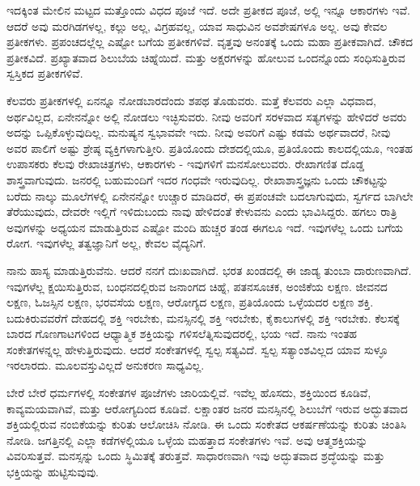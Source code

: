 ಇದಕ್ಕಿಂತ ಮೇಲಿನ ಮಟ್ಟದ ಮತ್ತೊಂದು ವಿಧದ ಪೂಜೆ ಇದೆ. ಅದೇ ಪ್ರತೀಕದ ಪೂಜೆ, ಅಲ್ಲಿ ಇನ್ನೂ ಆಕಾರಗಳು ಇವೆ. ಆದರೆ ಅವು ಮರಗಿಡಗಳಲ್ಲ, ಕಲ್ಲು ಅಲ್ಲ, ವಿಗ್ರಹವಲ್ಲ, ಯಾವ ಸಾಧುವಿನ ಅವಶೇಷಗಳೂ ಅಲ್ಲ. ಅವು ಕೇವಲ ಪ್ರತೀಕಗಳು. ಪ್ರಪಂಚದಲ್ಲೆಲ್ಲ ಎಷ್ಟೋ ಬಗೆಯ ಪ್ರತೀಕಗಳಿವೆ. ವೃತ್ತವು ಅನಂತಕ್ಕೆ ಒಂದು ಮಹಾ ಪ್ರತೀಕವಾಗಿದೆ. ಚೌಕದ ಪ್ರತೀಕವಿದೆ. ಪ್ರಖ್ಯಾತವಾದ ಶಿಲುಬೆಯ ಚಿಹ್ನೆಯಿದೆ.  ಮತ್ತು  ಅಕ್ಷರಗಳನ್ನು ಹೋಲುವ ಒಂದನ್ನೊಂದು ಸಂಧಿಸುತ್ತಿರುವ ಸ್ವಸ್ತಿಕದ ಪ್ರತೀಕಗಳಿವೆ.

ಕೆಲವರು ಪ್ರತೀಕಗಳಲ್ಲಿ ಏನನ್ನೂ ನೋಡಬಾರದೆಂದು ಶಪಥ ತೊಡುವರು. ಮತ್ತೆ ಕೆಲವರು ಎಲ್ಲಾ ವಿಧವಾದ, ಅರ್ಥವಿಲ್ಲದ, ಏನೇನನ್ನೋ ಅಲ್ಲಿ ನೋಡಲು ಇಚ್ಛಿಸುವರು. ನೀವು ಅವರಿಗೆ ಸರಳವಾದ ಸತ್ಯಗಳನ್ನು ಹೇಳಿದರೆ ಅವರು ಅದನ್ನು ಒಪ್ಪಿಕೊಳ್ಳುವುದಿಲ್ಲ. ಮನುಷ್ಯನ ಸ್ವಭಾವವೇ ಇದು. ನೀವು ಅವರಿಗೆ ಎಷ್ಟು ಕಡಮೆ ಅರ್ಥವಾದರೆ, ನೀವು ಅವರ ಪಾಲಿಗೆ ಅಷ್ಟು ಶ್ರೇಷ್ಠ ವ್ಯಕ್ತಿಗಳಾಗುತ್ತೀರಿ. ಪ್ರತಿಯೊಂದು ದೇಶದಲ್ಲಿಯೂ, ಪ್ರತಿಯೊಂದು ಕಾಲದಲ್ಲಿಯೂ, ಇಂತಹ ಉಪಾಸಕರು ಕೆಲವು ರೇಖಾಚಿತ್ರಗಳು, ಆಕಾರಗಳು - ಇವುಗಳಿಗೆ ಮನಸೋಲುವರು. ರೇಖಾಗಣಿತ ದೊಡ್ಡ ಶಾಸ್ತ್ರವಾಗುವುದು. ಜನರಲ್ಲಿ ಬಹುಮಂದಿಗೆ ಇದರ ಗಂಧವೇ ಇರುವುದಿಲ್ಲ. ರೇಖಾಶಾಸ್ತ್ರಜ್ಞನು ಒಂದು ಚೌಕಟ್ಟನ್ನು ಬರೆದು ನಾಲ್ಕು ಮೂಲೆಗಳಲ್ಲಿ ಏನೇನನ್ನೋ ಉಚ್ಚಾರ ಮಾಡಿದರೆ, ಈ ಪ್ರಪಂಚವೇ ಬದಲಾಗುವುದು, ಸ್ವರ್ಗದ ಬಾಗಿಲೇ ತೆರೆಯುವುದು, ದೇವರೇ ಇಲ್ಲಿಗೆ ಇಳಿದುಬಂದು ನಾವು ಹೇಳಿದಂತೆ ಕೇಳುವನು ಎಂದು ಭಾವಿಸಿದ್ದರು. ಹಗಲು ರಾತ್ರಿ ಅವುಗಳನ್ನು ಅಧ್ಯಯನ ಮಾಡುತ್ತಿರುವ ಎಷ್ಟೋ ಮಂದಿ ಹುಚ್ಚರ ತಂಡ ಈಗಲೂ ಇದೆ. ಇವುಗಳೆಲ್ಲ ಒಂದು ಬಗೆಯ ರೋಗ. ಇವುಗಳೆಲ್ಲ ತತ್ವಜ್ಞಾನಿಗೆ ಅಲ್ಲ, ಕೇವಲ ವೈದ್ಯನಿಗೆ.

ನಾನು ಹಾಸ್ಯ ಮಾಡುತ್ತಿರುವೆನು. ಆದರೆ ನನಗೆ ದುಃಖವಾಗಿದೆ. ಭರತ ಖಂಡದಲ್ಲಿ ಈ ಜಾಡ್ಯ ತುಂಬಾ ದಾರುಣವಾಗಿದೆ. ಇವುಗಳೆಲ್ಲ ಕ್ಷಯಿಸುತ್ತಿರುವ, ಬಂಧನದಲ್ಲಿರುವ ಜನಾಂಗದ ಚಿಹ್ನೆ, ಪತನಸೂಚಕ, ಅಂಜಿಕೆಯ ಲಕ್ಷಣ. ಜೀವನದ ಲಕ್ಷಣ, ಓಜಸ್ಸಿನ ಲಕ್ಷಣ, ಭರವಸೆಯ ಲಕ್ಷಣ, ಆರೋಗ್ಯದ ಲಕ್ಷಣ, ಪ್ರತಿಯೊಂದು ಒಳ್ಳೆಯದರ ಲಕ್ಷಣ ಶಕ್ತಿ. ಬದುಕಿರುವವರೆಗೆ ದೇಹದಲ್ಲಿ ಶಕ್ತಿ ಇರಬೇಕು, ಮನಸ್ಸಿನಲ್ಲಿ ಶಕ್ತಿ ಇರಬೇಕು, ಕೈಕಾಲುಗಳಲ್ಲಿ ಶಕ್ತಿ ಇರಬೇಕು. ಕೆಲಸಕ್ಕೆ ಬಾರದ ಗೊಣಗಾಟಗಳಿಂದ ಆಧ್ಯಾತ್ಮಿಕ ಶಕ್ತಿಯನ್ನು ಗಳಿಸಲೆತ್ನಿಸುವುದರಲ್ಲಿ, ಭಯ ಇದೆ. ನಾನು ಇಂತಹ ಸಂಕೇತಗಳನ್ನಲ್ಲ ಹೇಳುತ್ತಿರುವುದು. ಆದರೆ ಸಂಕೇತಗಳಲ್ಲಿ ಸ್ವಲ್ಪ ಸತ್ಯವಿದೆ. ಸ್ವಲ್ಪ ಸತ್ಯಾಂಶವಿಲ್ಲದ ಯಾವ ಸುಳ್ಳೂ ಇರಲಾರದು. ಮೂಲವಸ್ತುವಿಲ್ಲದೆ ಅನುಕರಣ ಸಾಧ್ಯವಿಲ್ಲ.

ಬೇರೆ ಬೇರೆ ಧರ್ಮಗಳಲ್ಲಿ ಸಂಕೇತಗಳ ಪೂಜೆಗಳು ಜಾರಿಯಲ್ಲಿವೆ. ಇವೆಲ್ಲ ಹೊಸದು, ಶಕ್ತಿಯಿಂದ ಕೂಡಿವೆ, ಕಾವ್ಯಮಯವಾಗಿವೆ, ಮತ್ತು ಆರೋಗ್ಯದಿಂದ ಕೂಡಿವೆ. ಲಕ್ಷಾಂತರ ಜನರ ಮನಸ್ಸಿನಲ್ಲಿ ಶಿಲುಬೆಗೆ ಇರುವ ಅದ್ಭುತವಾದ ಶಕ್ತಿಯಲ್ಲಿರುವ ನಂಬಿಕೆಯನ್ನು ಕುರಿತು ಆಲೋಚಿಸಿ ನೋಡಿ. ಈ ಒಂದು ಸಂಕೇತದ ಆಕರ್ಷಣೆಯನ್ನು ಕುರಿತು ಚಿಂತಿಸಿ ನೋಡಿ. ಜಗತ್ತಿನಲ್ಲಿ ಎಲ್ಲಾ ಕಡೆಗಳಲ್ಲಿಯೂ ಒಳ್ಳೆಯ ಮಹತ್ತಾದ ಸಂಕೇತಗಳು ಇವೆ. ಅವು ಆತ್ಮಶಕ್ತಿಯನ್ನು ವಿವರಿಸುತ್ತವೆ. ಮನಸ್ಸನ್ನು ಒಂದು ಸ್ಥಿಮಿತಕ್ಕೆ ತರುತ್ತವೆ. ಸಾಧಾರಣವಾಗಿ ಇವು ಅದ್ಭುತವಾದ ಶ್ರದ್ಧೆಯನ್ನು ಮತ್ತು ಭಕ್ತಿಯನ್ನು ಹುಟ್ಟಿಸುವುವು.

